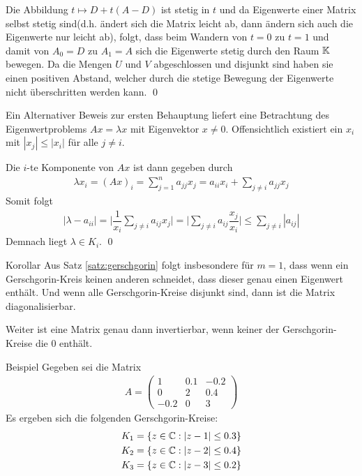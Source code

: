Die Abbildung $t\mapsto D + t(A-D)$ 
ist stetig in $t$ und da Eigenwerte einer Matrix selbst stetig sind(d.h. ändert sich die Matrix leicht ab, dann ändern 
sich auch die Eigenwerte nur leicht ab), folgt, dass beim Wandern von $t=0$ zu $t=1$ und damit von $A_0=D$ zu $A_1=A$ sich 
die Eigenwerte stetig durch den Raum $\mathbb K$ bewegen. Da die Mengen $U$ und $V$ abgeschlossen und disjunkt sind haben sie einen 
positiven Abstand, welcher durch die stetige Bewegung der Eigenwerte nicht überschritten werden kann.
\qed 

Ein Alternativer Beweis zur ersten Behauptung liefert eine Betrachtung des 
Eigenwertproblems $Ax=\lambda x$ mit Eigenvektor $x\neq 0$. 
Offensichtlich existiert ein $x_i$ mit $|x_j|\leq |x_i|$ für alle 
$j\neq i$. 

Die $i$-te Komponente von $Ax$ ist dann gegeben durch 
%
\begin{align*}
  \lambda x_i 
  = (Ax)_i = \sum_{j=1}^{n} a_{jj}x_j = a_{ii}x_i + \sum_{j\neq i} a_{jj}x_j 
\end{align*}
%
Somit folgt 
%
\begin{align*}
  |\lambda-a_{ii}| 
  = \Big|\dfrac{1}{x_i}\sum_{j\neq i} a_{ij} x_j\Big|
  = \Big|\sum_{j\neq i} a_{ij} \dfrac{x_j}{x_i}\Big|
  \leq \sum_{j\neq i}|a_{ij}|
\end{align*}
%
Demnach liegt $\lambda\in K_i$.
\qed

\begin{colbox}{Korollar}
  Aus Satz \ref{satz:gerschgorin} folgt insbesondere für $m=1$, dass wenn ein Gerschgorin-Kreis keinen anderen schneidet,
  dass dieser genau einen Eigenwert enthält. Und wenn alle Gerschgorin-Kreise disjunkt sind, dann ist die Matrix 
  diagonalisierbar. 

  Weiter ist eine Matrix genau dann invertierbar, wenn keiner der Gerschgorin-Kreise die 0 enthält.
\end{colbox}

\begin{colbox}{Beispiel}
  Gegeben sei die Matrix 
  \begin{align*}A = \begin{pmatrix}
    1 & 0.1 & -0.2 \\ 0 & 2 & 0.4 \\ -0.2 & 0 & 3
  \end{pmatrix}\end{align*}
  Es ergeben sich die folgenden Gerschgorin-Kreise:
  \begin{align*}
    K_1 = \{z\in\mathbb C : |z-1|\leq 0.3\} \\
    K_2 = \{z\in\mathbb C : |z-2|\leq 0.4\} \\
    K_3 = \{z\in\mathbb C : |z-3|\leq 0.2\} \\
  \end{align*}
  \begin{center}
    
  \end{center}
\end{colbox}

